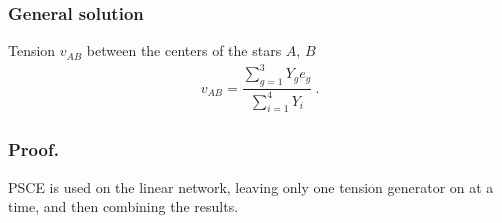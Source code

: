 \documentclass[letterpaper,10pt,english]{jupyterBook}
\begin{document}
\subsubsection{General solution}
\label{\detokenize{ch/electrical-engineering-three-phase:general-solution}}
\sphinxAtStartPar
Tension \(v_{AB}\) between the centers of the stars \(A\), \(B\)
\begin{equation*}
\begin{split}v_{AB} = \dfrac{\sum_{g=1}^{3} Y_g e_g}{\sum_{i=1}^{4} Y_i} \ .\end{split}
\end{equation*}\subsubsection*{Proof.}

\sphinxAtStartPar
PSCE is used on the linear network, leaving only one tension generator on at a time, and then combining the results.
\end{document}
